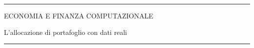 \documentclass[12pt,aspectratio=169]{beamer}
\begin{document}
\begin{frame}
\unitlength 5mm

\begin{center}

\rule{\textwidth}{2pt}

\vskip3mm
ECONOMIA E FINANZA COMPUTAZIONALE

L'allocazione di portafoglio con dati reali
\rule{\textwidth}{2pt}

\end{center}

\end{frame}


\end{document}
